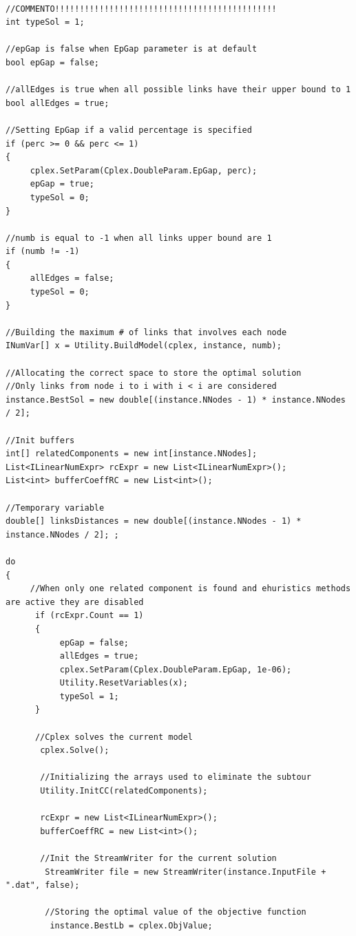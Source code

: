 \documentclass[11pt]{article}
\begin{document}
\begin{lstlisting}

//COMMENTO!!!!!!!!!!!!!!!!!!!!!!!!!!!!!!!!!!!!!!!!!!!!!
int typeSol = 1;

//epGap is false when EpGap parameter is at default
bool epGap = false;

//allEdges is true when all possible links have their upper bound to 1
bool allEdges = true;

//Setting EpGap if a valid percentage is specified
if (perc >= 0 && perc <= 1)
{
     cplex.SetParam(Cplex.DoubleParam.EpGap, perc);
     epGap = true;
     typeSol = 0;
}

//numb is equal to -1 when all links upper bound are 1
if (numb != -1)
{
     allEdges = false;
     typeSol = 0;
}

//Building the maximum # of links that involves each node
INumVar[] x = Utility.BuildModel(cplex, instance, numb);

//Allocating the correct space to store the optimal solution
//Only links from node i to i with i < i are considered
instance.BestSol = new double[(instance.NNodes - 1) * instance.NNodes / 2];

//Init buffers
int[] relatedComponents = new int[instance.NNodes];
List<ILinearNumExpr> rcExpr = new List<ILinearNumExpr>();
List<int> bufferCoeffRC = new List<int>();

//Temporary variable
double[] linksDistances = new double[(instance.NNodes - 1) * instance.NNodes / 2]; ;

do
{
     //When only one related component is found and ehuristics methods are active they are disabled
      if (rcExpr.Count == 1)
      {
           epGap = false;
           allEdges = true;
           cplex.SetParam(Cplex.DoubleParam.EpGap, 1e-06);
           Utility.ResetVariables(x);
           typeSol = 1;
      }

      //Cplex solves the current model
       cplex.Solve();

       //Initializing the arrays used to eliminate the subtour
       Utility.InitCC(relatedComponents);

       rcExpr = new List<ILinearNumExpr>();
       bufferCoeffRC = new List<int>();

       //Init the StreamWriter for the current solution
        StreamWriter file = new StreamWriter(instance.InputFile + ".dat", false);

        //Storing the optimal value of the objective function
         instance.BestLb = cplex.ObjValue;


\end{lstlisting}
\end{document}
